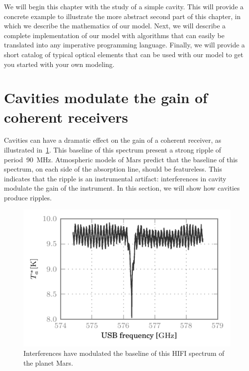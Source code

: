 We will begin this chapter with the study of a simple cavity.
This will provide a concrete example to illustrate the more abstract second part of this chapter, in which we describe the mathematics of our model.
Next, we will describe a complete implementation of our model with algorithms that can easily be translated into any imperative programming language.
Finally, we will provide a short catalog of typical optical elements that can be used with our model to get you started with your own modeling.





\FloatBarrier


\section{Cavities modulate the gain of coherent receivers}
\label{sec:from_cavity_to_ripple}
\label{sec:fabry_perot_example}

Cavities can have a dramatic effect on the gain of a coherent receiver, as illustrated in~\cref{fig:mars_50010cb7_WBSH_USB_chp2}.
This baseline of this spectrum present a strong ripple of period~\SI{90}{\mega\hertz}.
Atmospheric models of Mars predict that the baseline of this spectrum, on each side of the absorption line, should be featureless.
This indicates that the ripple is an instrumental artifact: interferences in cavity modulate the gain of the instrument.
In this section, we will show how cavities produce ripples.
\begin{figure}[hbtp]
    \centering
    \includegraphics[width=\textwidth]{mars_50010cb7_WBSH_USB}
    \caption{Interferences have modulated the baseline of this HIFI spectrum of the planet Mars.}
    \label{fig:mars_50010cb7_WBSH_USB_chp2}
\end{figure}

